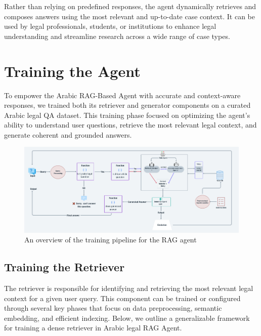 Rather than relying on predefined responses, the agent dynamically retrieves and composes answers using the most relevant and up-to-date case context. It can be used by legal professionals, students, or institutions to enhance legal understanding and streamline research across a wide range of case types.
\section{Training the Agent}
To empower the Arabic RAG-Based Agent with accurate and context-aware responses, we trained both its retriever and generator components on a curated Arabic legal QA dataset. This training phase focused on optimizing the agent’s ability to understand user questions, retrieve the most relevant legal context, and generate coherent and grounded answers.
\begin{figure}[h]
	\centering
	\includegraphics[width=0.8\linewidth]{Figures/trainingagent.png}
\caption{An overview of the training pipeline for the RAG agent }
	
	\label{agentic_trining}
	
\end{figure}


\subsection{Training the Retriever}
The retriever is responsible for identifying and retrieving the most relevant legal context for a given user query. This component can be trained or configured through several key phases that focus on data preprocessing, semantic embedding, and efficient indexing. Below, we outline a generalizable framework for training a dense retriever in Arabic legal RAG Agent.

